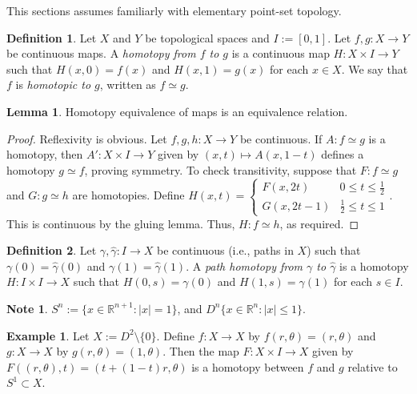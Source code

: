 \documentclass[10pt,letterpaper,cm]{nupset}
\theoremstyle{definition}
\newtheorem*{definition}{Definition}
\newtheorem{exmp}{Example}
\newtheorem{note}{Note}
\newtheorem{lemma}{Lemma}
\newcommand{\R}{\mathbb R}
\newcommand{\1}{\mathbf{1}}
\newcommand{\0}{\vec 0}
\begin{document}
This sections assumes familiarly with elementary point-set topology.

\begin{definition}
Let $X$ and $Y$ be topological spaces and $I:= [0,1]$. Let $f,g: X \to Y$ be continuous maps. A \textit{homotopy from $f$ to $g$} is a continuous map $H: X \times I \to Y$ such that $H(x,0) = f(x)$ and $H(x,1) = g(x)$ for each $x\in X$. We say that $f$ is \textit{homotopic to $g$}, written as $f\simeq g$.
\end{definition}

\begin{lemma}
Homotopy equivalence of maps is an equivalence relation.
\end{lemma}
\begin{proof}
Reflexivity is obvious.  Let $f, g, h : X \to Y$ be continuous. If $A: f \simeq g$ is a homotopy, then $A' : X \times I \to Y$ given by $(x,t) \mapsto A(x, 1-t)$ defines a homotopy $g\simeq f$, proving symmetry. To check transitivity, suppose that $F : f \simeq g$ and $G: g\simeq h$ are homotopies. Define $H(x,t) = \begin{cases}
F(x, 2t) & 0 \leq t \leq \frac{1}{2}
\\ G(x, 2t-1) & \frac{1}{2} \leq t \leq 1
\end{cases}.$ This is continuous by the gluing lemma. Thus, $H : f \simeq h$, as required. 
\end{proof}

\begin{definition}
Let $\gamma, \hat{\gamma}: I \to X$ be continuous (i.e., paths in $X$) such that $\gamma(0) = \hat{\gamma}(0)$ and $\gamma(1) = \hat{\gamma}(1)$.  A \textit{path homotopy from $\gamma$ to $\hat{\gamma}$} is a homotopy $H: I \times I \to X$ such that $H(0,s) = \gamma(0)$ and $H(1,s) = \gamma(1)$ for each $s\in I$.
\end{definition}

\begin{note}
$S^n := \{x\in \R^{n+1} : |x| =1\}$, and $D^n \{x\in \R^n : |x|\leq 1\}$.
\end{note}

\begin{exmp}
Let $X:= D^2 \setminus \{0\}$. Define $f: X \to X$ by $f(r, \theta) = (r, \theta)$ and $g: X \to X$ by $g(r, \theta) = (1, \theta)$. Then the map $F: X \times I \to X$ given by  $F((r, \theta), t)=  (t+ (1-t)r, \theta)$ is a homotopy between $f$ and $g$ relative to $S^1\subset X$.
\end{exmp}
\end{document}
